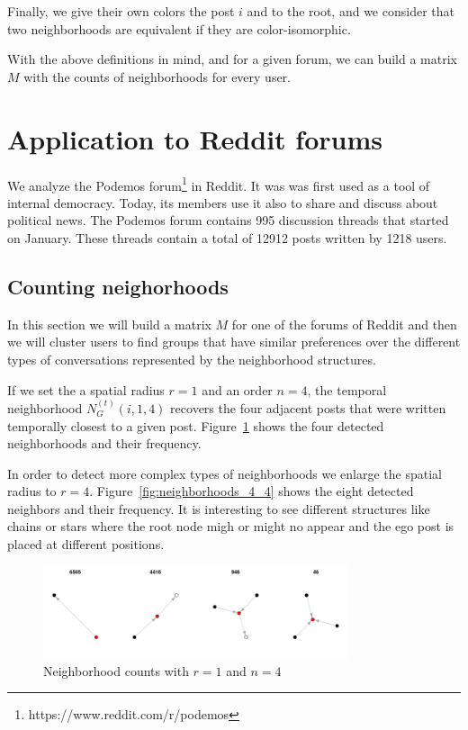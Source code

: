 \documentclass[smallextended]{svjour3}          %
\begin{document}
Finally, we give their own colors the post $i$ and to the root, and we consider that two neighborhoods are equivalent if they are color-isomorphic.

With the above definitions in mind, and for a given forum, we can build a matrix $M$ with the counts of neighborhoods for every user. 

\section{Application to Reddit forums}

We analyze the Podemos forum\footnote{https://www.reddit.com/r/podemos} in Reddit. It was was first used as a tool of internal democracy. Today, its members use it also to share and discuss about political news.
The Podemos forum contains 995 discussion threads that started on January. These threads contain a total of 12912 posts written by 1218 users.

\subsection{Counting neighorhoods}
In this section we will build a matrix $M$ for one of the forums of Reddit and then we will cluster users to find groups that have similar preferences over the different types of conversations represented by the neighborhood structures. 

If we set the a spatial radius $r=1$ and an order $n=4$, the temporal neighborhood $N_{G}^{(t)}(i, 1, 4)$ recovers the four adjacent posts that were written temporally closest to a given post. Figure~\ref{fig:neighborhoods_1_4} shows the four detected neighborhoods and their frequency.

In order to detect more complex types of neighborhoods we enlarge the spatial radius to $r=4$. Figure~\ref{fig:neighborhoods_4_4} shows the eight detected neighbors and their frequency. It is interesting to see different structures like chains or stars where the root node migh or might no appear and the ego post is placed at different positions.

\begin{figure}
	\centering
	\includegraphics[width=0.8\textwidth]{neighborhoods_1_4}
	\caption{Neighborhood counts with $r=1$ and $n=4$}
	\label{fig:neighborhoods_1_4}
\end{figure}
\end{document}
